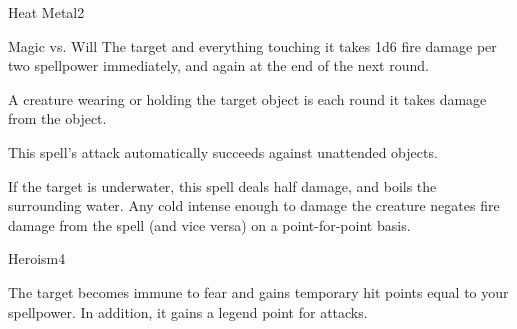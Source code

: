 \begin{spellsection}{Heat Metal}{2}
    \begin{spellheader}
    \end{spellheader}
    \begin{spellcontent}
        \begin{spelltargetinginfo}
        \end{spelltargetinginfo}
        \begin{spelleffects}
            \begin{spellattack}{Magic vs. Will}
                \spellsuccess The target and everything touching it takes 1d6 fire damage per two spellpower immediately, and again at the end of the next round.

                A creature wearing or holding the target object is \dazed each round it takes damage from the object.
            \end{spellattack}
        \end{spelleffects}
    \end{spellcontent}
    \begin{spellfooter}
        \spellnotes This spell's attack automatically succeeds against unattended objects.

        If the target is underwater, this spell deals half damage, and boils the surrounding water. Any cold intense enough to damage the creature negates fire damage from the spell (and vice versa) on a point-for-point basis.
        \miscastrandom
    \end{spellfooter}
\end{spellsection}

\begin{spellsection}{Heroism}{4}
    \begin{spellheader}
    \end{spellheader}
    \begin{spellcontent}
        \begin{spelltargetinginfo}
        \end{spelltargetinginfo}
        \begin{spelleffects}
            \spelleffect The target becomes immune to fear and gains temporary hit points equal to your spellpower. In addition, it gains a legend point for attacks.
            \spelldur \durshort \dismissable
        \end{spelleffects}
    \end{spellcontent}
    \begin{spellfooter}
        \miscastrandom
    \end{spellfooter}
\end{spellsection}

